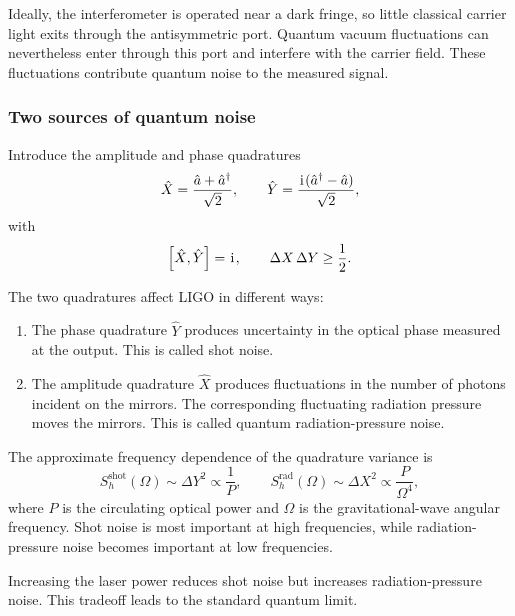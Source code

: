 Ideally, the interferometer is operated near a dark fringe, so little
classical carrier light exits through the antisymmetric port. Quantum vacuum
fluctuations can nevertheless enter through this port and interfere with the
carrier field. These fluctuations contribute quantum noise to the measured
signal.

\subsubsection{Two sources of quantum noise}

Introduce the amplitude and phase quadratures
\begin{equation}
    \hat X=\frac{\hat a+\hat a^\dagger}{\sqrt{2}},
    \qquad
    \hat Y=\frac{\hspace{1pt}\mathrm{i}\hspace{1pt}(\hat a^\dagger-\hat a)}{\sqrt{2}},
\end{equation}
with
\begin{equation}
    \left[\hat X,\hat Y\right]=\hspace{1pt}\mathrm{i}\hspace{1pt},
    \qquad
    \Delta X\,\Delta Y\geq\frac12.
\end{equation}

The two quadratures affect LIGO in different ways:

\begin{enumerate}
    \item The phase quadrature \(\hat Y\) produces uncertainty in the
    optical phase measured at the output. This is called shot noise.

    \item The amplitude quadrature \(\hat X\) produces fluctuations in the
    number of photons incident on the mirrors. The corresponding fluctuating
    radiation pressure moves the mirrors. This is called quantum
    radiation-pressure noise.
\end{enumerate}

The approximate frequency dependence of the quadrature variance is
\begin{equation}
    S_h^{\text{shot}}(\Omega)\sim\Delta Y^2\propto\frac{1}{P},
    \qquad
    S_h^{\text{rad}}(\Omega)\sim\Delta X^2\propto\frac{P}{\Omega^4},
\end{equation}
where \(P\) is the circulating optical power and \(\Omega\) is the
gravitational-wave angular frequency. Shot noise is most important at high
frequencies, while radiation-pressure noise becomes important at low
frequencies.

Increasing the laser power reduces shot noise but increases
radiation-pressure noise. This tradeoff leads to the standard quantum limit.

